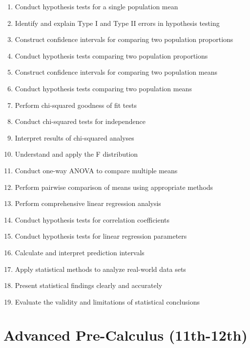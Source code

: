 \documentclass[11pt]{article}
\begin{document}
\begin{enumerate}
\item Conduct hypothesis tests for a single population mean
\item Identify and explain Type I and Type II errors in hypothesis testing
\item Construct confidence intervals for comparing two population proportions
\item Conduct hypothesis tests comparing two population proportions
\item Construct confidence intervals for comparing two population means
\item Conduct hypothesis tests comparing two population means
\item Perform chi-squared goodness of fit tests
\item Conduct chi-squared tests for independence
\item Interpret results of chi-squared analyses
\item Understand and apply the F distribution
\item Conduct one-way ANOVA to compare multiple means
\item Perform pairwise comparison of means using appropriate methods
\item Perform comprehensive linear regression analysis
\item Conduct hypothesis tests for correlation coefficients
\item Conduct hypothesis tests for linear regression parameters
\item Calculate and interpret prediction intervals
\item Apply statistical methods to analyze real-world data sets
\item Present statistical findings clearly and accurately
\item Evaluate the validity and limitations of statistical conclusions
\end{enumerate}

\section{Advanced Pre-Calculus (11th-12th)}
\end{document}
